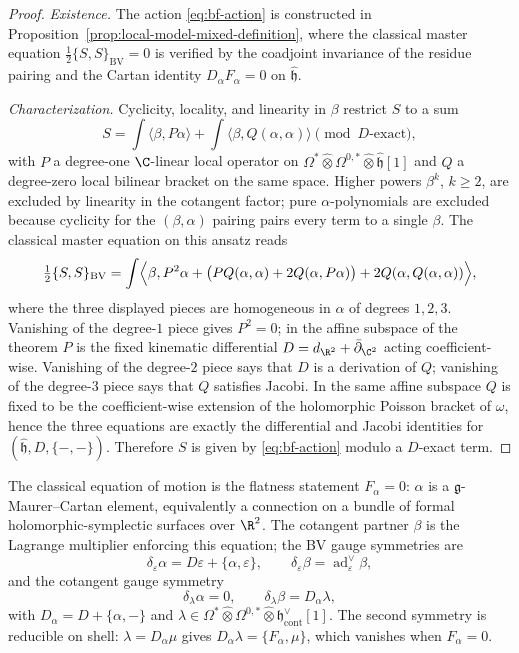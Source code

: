 \documentclass[11pt]{memoir}
\begin{document}
\begin{proof}
  \emph{Existence.} The action \eqref{eq:bf-action} is constructed in
  Proposition~\ref{prop:local-model-mixed-definition}, where the
  classical master equation
  $\tfrac12\{S,S\}_{\mathrm{BV}}=0$ is verified by the coadjoint
  invariance of the residue pairing and the Cartan identity
  $D_\alpha F_\alpha=0$ on $\widehat{\mathfrak h}$.

  \emph{Characterization.} Cyclicity, locality, and linearity in $\beta$
  restrict $S$ to a sum
  \[
    S=\int\langle\beta,P\alpha\rangle
      +\int\langle\beta,Q(\alpha,\alpha)\rangle
      \pmod{D\text{-exact}},
  \]
  with $P$ a degree-one $\C$-linear local operator on
  $\Omega^*\widehat\otimes\Omega^{0,*}\widehat\otimes\widehat{\mathfrak h}[1]$
  and $Q$ a degree-zero local bilinear bracket on the same space.
  Higher powers $\beta^k$, $k\geq 2$, are excluded by linearity in the
  cotangent factor; pure $\alpha$-polynomials are excluded because
  cyclicity for the $(\beta,\alpha)$ pairing pairs every term to a
  single $\beta$.  The classical master equation on this ansatz reads
  \[
    \tfrac12\{S,S\}_{\mathrm{BV}}
    =\int\Bigl\langle\beta,
      P^2\alpha
      +\bigl(P Q(\alpha,\alpha)+2Q(\alpha,P\alpha)\bigr)
      +2Q(\alpha,Q(\alpha,\alpha))\Bigr\rangle,
  \]
  where the three displayed pieces are homogeneous in $\alpha$ of
  degrees $1,2,3$.  Vanishing of the degree-$1$ piece gives \(P^2=0\);
  in the affine subspace of the theorem \(P\) is the fixed kinematic
  differential \(D=d_{\R^2}+\bar\partial_{\C^2}\) acting
  coefficient-wise.  Vanishing of the degree-$2$ piece says that \(D\)
  is a derivation of \(Q\); vanishing of the degree-$3$ piece says that
  \(Q\) satisfies Jacobi.  In the same affine subspace \(Q\) is fixed to
  be the coefficient-wise extension of the holomorphic Poisson bracket
  of \(\omega\), hence the three equations are exactly the differential
  and Jacobi identities for \((\widehat{\mathfrak h},D,\{-,-\})\).
  Therefore \(S\) is given by \eqref{eq:bf-action} modulo a
  \(D\)-exact term.
\end{proof}

The classical equation of motion is the flatness statement
$F_\alpha=0$: $\alpha$ is a $\mathfrak g$-Maurer--Cartan element,
equivalently a connection on a bundle of formal holomorphic-symplectic
surfaces over $\R^2$.  The cotangent partner $\beta$ is the Lagrange
multiplier enforcing this equation; the BV gauge symmetries are
$$\delta_\varepsilon\alpha=D\varepsilon+\{\alpha,\varepsilon\},\qquad
  \delta_\varepsilon\beta=\operatorname{ad}^\vee_\varepsilon\beta,$$
and the cotangent gauge symmetry
$$\delta_\lambda\alpha=0,\qquad
  \delta_\lambda\beta=D_\alpha\lambda,$$
with $D_\alpha=D+\{\alpha,-\}$ and $\lambda\in
\Omega^*\widehat\otimes\Omega^{0,*}\widehat\otimes\mathfrak h^\vee_{\mathrm{cont}}[1]$.
The second symmetry is reducible on shell: $\lambda=D_\alpha\mu$ gives
$D_\alpha\lambda=\{F_\alpha,\mu\}$, which vanishes when $F_\alpha=0$.
\end{document}
